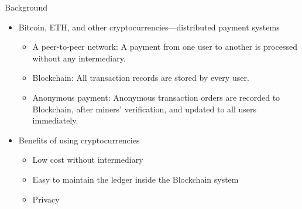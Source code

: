 \documentclass[notes=show, beamer, handout]{beamer}
\begin{document}
\begin{frame}{Background}




\begin{itemize}
\item Bitcoin, ETH, and other cryptocurrencies---distributed payment systems
\begin{itemize}
\item A peer-to-peer network: A payment from one user to another is processed without any intermediary.
\item Blockchain: All transaction records are stored by every user.
\item Anonymous payment: Anonymous transaction orders are recorded to Blockchain, after miners' verification, and updated to all users immediately.
\end{itemize}
  \pause
  \item Benefits of using cryptocurrencies
\begin{itemize}
\item Low cost without intermediary
\item Easy to maintain the ledger inside the Blockchain system
\item Privacy
\end{itemize}


\end{itemize}
\end{frame}


%
\end{document}
